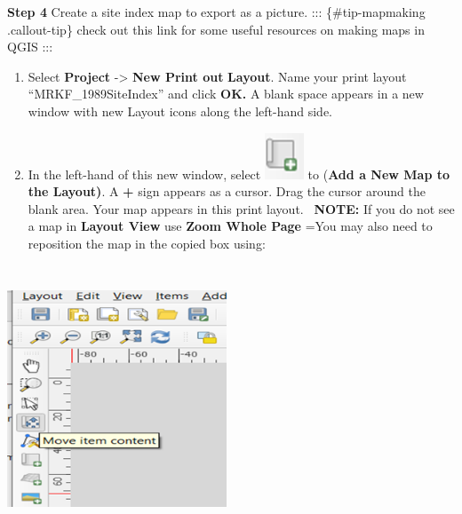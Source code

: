 \documentclass[
  letterpaper,
]{book}
\begin{document}
\textbf{Step 4} Create a site index map to export as a picture. :::
\{\#tip-mapmaking .callout-tip\} check out this link for some useful
resources on making maps in QGIS :::

\begin{enumerate}
\def\labelenumi{\Alph{enumi}.}
\item
  Select \textbf{Project} -\textgreater{} \textbf{New Print out}
  \textbf{Layout}. Name your print layout ``MRKF\_1989SiteIndex'' and
  click \textbf{OK.} A blank space appears in a new window with new
  Layout icons along the left-hand side.
\item
  In the left-hand of this new window, select
  \includegraphics{images/clipboard-3366220892.png} to (\textbf{Add a
  New Map to the Layout)}. A \textbf{+} sign appears as a cursor. Drag
  the cursor around the blank area. Your map appears in this print
  layout. ~\textbf{NOTE:} If you do not see a map in \textbf{Layout
  View} use \textbf{Zoom Whole Page} =You may also need to reposition
  the map in the copied box using:
\end{enumerate}

\includegraphics[width=2.57292in,height=3.13542in]{images/clipboard-3626068356.png}
\end{document}
